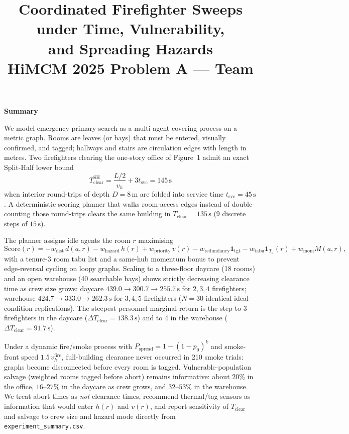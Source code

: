 \documentclass[12pt]{article}
\title{\textbf{Coordinated Firefighter Sweeps under Time, Vulnerability,\\
and Spreading Hazards}\\[0.4em]
\large HiMCM 2025 Problem A --- Team \TeamNumber}
\author{}
\date{}
\newcommand{\Tclear}{T_{\mathrm{clear}}}
\newcommand{\tsvc}{t_{\mathrm{svc}}}
\newcommand{\whall}{v_{h}}
\begin{document}
\maketitle
\thispagestyle{empty}

\begin{center}
{\Large \textbf{Summary}}
\end{center}

We model emergency primary-search as a multi-agent covering process on a metric graph.
Rooms are leaves (or bays) that must be entered, visually confirmed, and tagged; hallways
and stairs are circulation edges with length in metres. Two firefighters clearing the
one-story office of Figure~1 admit an exact Split-Half lower bound
\begin{equation*}
  \Tclear^{\mathrm{SH}}
  = \frac{L/2}{\whall} + 3\tsvc
  = 145\,\mathrm{s}
\end{equation*}
when interior round-trips of depth \(D=8\,\mathrm{m}\) are folded into service time
\(\tsvc=45\,\mathrm{s}\). A deterministic scoring planner that walks room-access edges
instead of double-counting those round-trips clears the same building in
\(\Tclear=135\,\mathrm{s}\) (9 discrete steps of \(15\,\mathrm{s}\)).

The planner assigns idle agents the room \(r\) maximising
\begin{equation*}
  \mathrm{Score}(r)
  = -w_{\mathrm{dist}}\,d(a,r)
    -w_{\mathrm{hazard}}\,h(r)
    +w_{\mathrm{priority}}\,v(r)
    -w_{\mathrm{redundancy}}\mathbf{1}_{\mathrm{tgt}}
    -w_{\mathrm{tabu}}\mathbf{1}_{T_a}(r)
    +w_{\mathrm{mom}}M(a,r),
\end{equation*}
with a tenure-3 room tabu list and a same-hub momentum bonus to prevent edge-reversal
cycling on loopy graphs. Scaling to a three-floor daycare (18 rooms) and an open
warehouse (40 searchable bays) shows strictly decreasing clearance time as crew size
grows: daycare \(439.0\to 300.7\to 255.7\,\mathrm{s}\) for \(2,3,4\) firefighters;
warehouse \(424.7\to 333.0\to 262.3\,\mathrm{s}\) for \(3,4,5\) firefighters
(\(N=30\) identical ideal-condition replications). The steepest personnel marginal
return is the step to 3 firefighters in the daycare (\(\Delta\Tclear=138.3\,\mathrm{s}\))
and to 4 in the warehouse (\(\Delta\Tclear=91.7\,\mathrm{s}\)).

Under a dynamic fire/smoke process with
\(P_{\mathrm{spread}}=1-(1-p_0)^{k}\) and smoke-front speed \(1.5\,\whall^{\mathrm{fire}}\),
full-building clearance never occurred in 210 smoke trials: graphs become disconnected
before every room is tagged. Vulnerable-population salvage (weighted rooms tagged before
abort) remains informative: about \(20\%\) in the office, \(16\)--\(27\%\) in the daycare
as crew grows, and \(32\)--\(53\%\) in the warehouse. We treat abort times as
\emph{not} clearance times, recommend thermal/tag sensors as information that would
enter \(h(r)\) and \(v(r)\), and report sensitivity of \(\Tclear\) and salvage to crew
size and hazard mode directly from \texttt{experiment\_summary.csv}.
\end{document}
